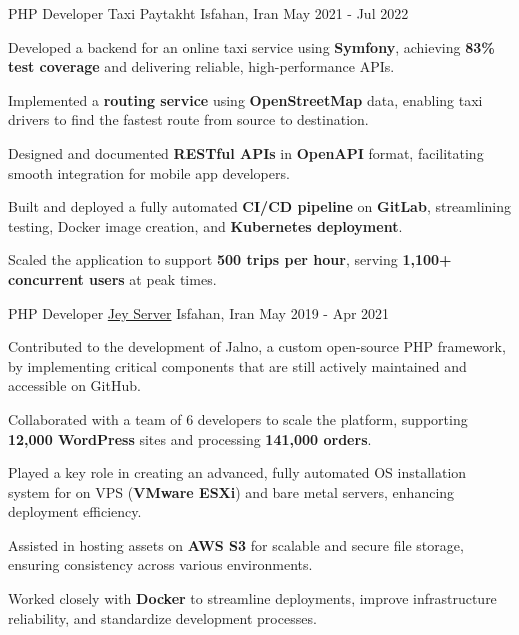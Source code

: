 \begin{cventries}
  \cventry
    {PHP Developer} %
    {Taxi Paytakht} %
    {Isfahan, Iran} %
    {May 2021 - Jul 2022} %
    {
      \begin{cvitems}
        \item {Developed a backend for an online taxi service using \textbf{Symfony}, achieving \textbf{83\% test coverage} and delivering reliable, high-performance APIs.}
        \item {Implemented a \textbf{routing service} using \textbf{OpenStreetMap} data, enabling taxi drivers to find the fastest route from source to destination.}
        \item {Designed and documented \textbf{RESTful APIs} in \textbf{OpenAPI} format, facilitating smooth integration for mobile app developers.}
        \item {Built and deployed a fully automated \textbf{CI/CD pipeline} on \textbf{GitLab}, streamlining testing, Docker image creation, and \textbf{Kubernetes deployment}.}
        \item {Scaled the application to support \textbf{500 trips per hour}, serving \textbf{1,100+ concurrent users} at peak times.}
      \end{cvitems}
    }

  \cventry
    {PHP Developer} %
    {\href{https://jeyserver.com}{Jey Server}} %
    {Isfahan, Iran} %
    {May 2019 - Apr 2021} %
    {
      \begin{cvitems}
        \item {Contributed to the development of Jalno, a custom open-source PHP framework, by implementing critical components that are still actively maintained and accessible on GitHub.}
        \item {Collaborated with a team of 6 developers to scale the platform, supporting \textbf{12,000 WordPress} sites and processing \textbf{141,000 orders}.}
        \item {Played a key role in creating an advanced, fully automated OS installation system for  on VPS (\textbf{VMware ESXi}) and bare metal servers, enhancing deployment efficiency.}
        \item {Assisted in hosting assets on \textbf{AWS S3} for scalable and secure file storage, ensuring consistency across various environments.}
        \item {Worked closely with \textbf{Docker} to streamline deployments, improve infrastructure reliability, and standardize development processes.}
      \end{cvitems}
    }

\end{cventries}
